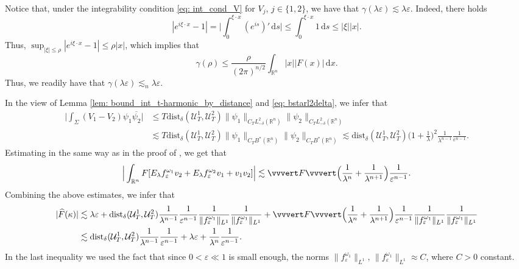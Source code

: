 \documentclass[10pt,a4paper]{amsart}
\theoremstyle{remark}
\theoremstyle{definition}
\newcommand{\R}{\mathbb{R}}
\newcommand{\dd}{\mathrm{d}}
\newcommand{\dist}{\mathrm{dist}}
\newcommand{\om}{\omega}
\def\ve{\varepsilon}
\def\lec{\lesssim}
\def\wh{\widehat}
\def\cal{\mathcal}
\def\ovl{\overline}
\begin{document}
%
Notice that, under the integrability condition \eqref{eq: int_cond_V} for $V_j$, $j\in\{1, 2\}$, 
we have that $\gamma(\lambda \ve) \lec \lambda \ve$. 
Indeed, there holds 
%
\begin{equation}\label{eq: complex_exp_bound}
|e^{i \xi \cdot x} - 1|=\Big|\int_0^{\xi\cdot x} (e^{is})' \, \dd s \Big| \leq \int_0^{\xi\cdot x} 1\, \dd s \leq |\xi| |x|.
\end{equation}
%
Thus, $\sup_{|\xi|\leq \rho}|e^{i\xi\cdot x} - 1| \leq \rho |x|$, which implies that
%
\[
\gamma(\rho) \leq \frac{\rho}{(2\pi)^{n/2}} \int_{\R^n} |x||F(x)| \, \dd x .
\]
%
Thus, we readily have that $\gamma(\lambda \ve)\lec_n \lambda \ve$. 

In the view of Lemma \ref{lem: bound_int_t-harmonic_by_distance} and \eqref{eq: bstarl2delta}, we infer that
%
\begin{align*}
%
\Big| \int_\Sigma (V_1-V_2) \psi_1 \ovl{\psi_2} \Big| &\leq
 T\dist_\delta(\cal{U}^1_T, \cal{U}^2_T) \|\psi_1\|_{C_T L^2_{-\delta}(\R^n)} \|\psi_2\|_{C_T L^2_{-\delta}(\R^n)}\\
&\lec T\dist_\delta(\cal{U}^1_T, \cal{U}^2_T) \|\psi_1\|_{C_TB^*(\R^n)} \|\psi_2\|_{C_T B^*(\R^n)} 
\lec \dist_\delta(\cal{U}^1_T, \cal{U}^2_T) \Big(1+\frac{1}{\lambda}\Big)^2 \frac{1}{\lambda^{n-1}} \frac{1}{\ve^{n-1}}.
%
\end{align*}
%
Estimating in the same way as in the proof of \cite[Theorem 1]{zbMATH08122191}, we get that 
%
\[
\Big| \int_{\R^n} F [E_\lambda f^{\om_1}_\ve v_2 + E_\lambda f^{\om_2}_\ve v_1 + v_1 v_2] \Big| 
\lec \vvvert F \vvvert \Big( \frac{1}{\lambda^n} + \frac{1}{\lambda^{n+1}} \Big) \frac{1}{\ve^{n-1}}.
\]
%
Combining the above estimates, we infer that 
%
\begin{align*}
%
|\wh{F}(\kappa)| &\lec 
\lambda \ve + \dist_\delta(\cal{U}^1_T, \cal{U}^2_T)  \frac{1}{\lambda^{n-1}} \frac{1}{\ve^{n-1}} \frac{1}{\|f^{\om_1}_\ve\|_{L^1}}\frac{1}{\|f^{\om_1}_\ve\|_{L^1}}
+ \vvvert F \vvvert \Big( \frac{1}{\lambda^n} + \frac{1}{\lambda^{n+1}} \Big) \frac{1}{\ve^{n-1}} \frac{1}{\|f^{\om_1}_\ve\|_{L^1}}\frac{1}{\|f^{\om_1}_\ve\|_{L^1}} \\
%
&\lec \dist_\delta(\cal{U}^1_T, \cal{U}^2_T)  \frac{1}{\lambda^{n-1}} \frac{1}{\ve^{n-1}} + \lambda \ve + \frac{1}{\lambda^n}\frac{1}{\ve^{n-1}}.
%
\end{align*}
%
In the last inequality we used the fact that since $0<\ve\ll1$ is small enough, the norms  
${\|f^{\om_1}_\ve\|_{L^1}} , \, {\|f^{\om_1}_\ve\|_{L^1}} \approx C$, where $C>0$ constant. 
\end{document}
